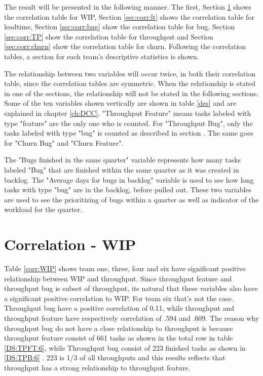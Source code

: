 \documentclass[UKenglish]{ifimaster}  %
\begin{document}
The result will be presented in the following manner. The first, Section \ref{sec:corr:WIP} shows the correlation table for WIP, Section \ref{sec:corr:lt} shows the correlation table for leadtime, Section \ref{sec:corr:bug} show the correlation table for bug, Section \ref {sec:corr:TP} show the correlation table for throughput and Section \ref {sec:corr:churn} show the correlation table for churn. Following the correlation tables, a section for each team's descriptive statistics  is shown.  


The relationship between two variables will occur twice, in both their correlation table, since the correlation tables are symmetric. When the relationship is stated in one of the sections, the relationship will not be stated in the following sections. Some of the ten variables shown vertically are shown in table \ref{des} and are explained in chapter \ref{ch:DCC}. "Throughput Feature" means tasks labeled with type "feature" are the only one who is counted. For "Throughput Bug", only the tasks labeled with type "bug" is counted as described in section . The same goes for "Churn Bug" and "Churn Feature". 

The "Bugs finished in the same quarter" variable represents how many tasks labeled "Bug" that are finished within the same quarter as it was created in backlog.  The "Average days for bugs in backlog" variable is used to see how long tasks with type "bug" are in the backlog, before pulled out. These two variables are used to see the prioritizing of bugs within a quarter as well as indicator of the workload for the quarter.   




\section{Correlation - WIP}
\label{sec:corr:WIP}
Table  \ref{corr:WIP} shows team one, three, four and six have significant positive relationship between WIP and throughput.  Since throughput feature and throughput bug is subset of throughput, its natural that these variables also have a significant positive correlation to WIP.  For team six that's not the case. Throughput bug have a positive correlation of 0.11, while throughput and throughput feature have respectively correlation of .594 and .609. The reason why throughput bug do not have a close relationship to throughput is because throughput feature consist of 661 tasks as shown in the total row in table \ref{DS:TPFT:6}, while Throughput bug consist of 223 finished tasks as shown in \ref{DS:TPB:6} . 223 is 1/3 of all throughputs and this results reflects that throughput has a strong relationship to throughput feature. 
\end{document}
